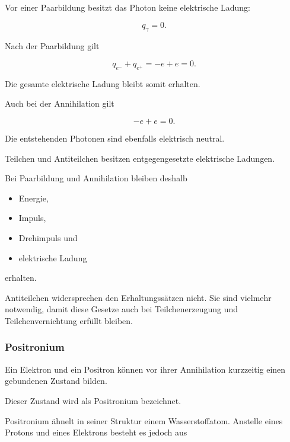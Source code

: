 Vor einer Paarbildung besitzt das Photon keine elektrische Ladung:

\begin{equation}
	q_{\gamma}
	=
	0.
\end{equation}

Nach der Paarbildung gilt

\begin{equation}
	q_{e^-}
	+
	q_{e^+}
	=
	-e
	+
	e
	=
	0.
\end{equation}

Die gesamte elektrische Ladung bleibt somit erhalten.

Auch bei der Annihilation gilt

\begin{equation}
	-e
	+
	e
	=
	0.
\end{equation}

Die entstehenden Photonen sind ebenfalls elektrisch neutral.

\begin{DidacticBox}
	\label{box:antiteilchen_erhaltungssaetze}
	
	Teilchen und Antiteilchen besitzen entgegengesetzte elektrische
	Ladungen.
	
	Bei Paarbildung und Annihilation bleiben deshalb
	
	\begin{itemize}
		\item Energie,
		\item Impuls,
		\item Drehimpuls und
		\item elektrische Ladung
	\end{itemize}
	
	erhalten.
	
	Antiteilchen widersprechen den Erhaltungssätzen nicht. Sie sind
	vielmehr notwendig, damit diese Gesetze auch bei Teilchenerzeugung und
	Teilchenvernichtung erfüllt bleiben.
\end{DidacticBox}

\subsubsection*{Positronium}

Ein Elektron und ein Positron können vor ihrer Annihilation kurzzeitig
einen gebundenen Zustand bilden.

Dieser Zustand wird als Positronium%
 bezeichnet.

Positronium ähnelt in seiner Struktur einem Wasserstoffatom. Anstelle
eines Protons und eines Elektrons besteht es jedoch aus

